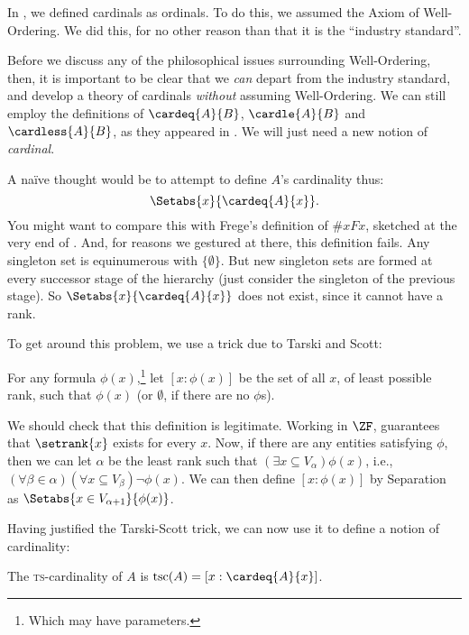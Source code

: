 \documentclass[../../../include/open-logic-section]{subfiles}
\begin{document}

In , we
defined cardinals as ordinals. To do this, we assumed the Axiom of
Well-Ordering. We did this, for no other reason than that it is the
``industry standard''.

Before we discuss any of the philosophical issues surrounding
Well-Ordering, then, it is important to be clear that we \emph{can}
depart from the industry standard, and develop a theory of cardinals
\emph{without} assuming Well-Ordering. We can still employ the
definitions of $\cardeq{A}{B}$, $\cardle{A}{B}$ and $\cardless{A}{B}$,
as they appeared in . We will just need a new
notion of \emph{cardinal}.

A na\"ive thought would be to attempt to define $A$'s cardinality thus:
\[
	\Setabs{x}{\cardeq{A}{x}}.
\]
You might want to compare this with Frege's definition of $\# x Fx$,
sketched at the very end of . And, for
reasons we gestured at there, this definition fails. Any singleton set
is equinumerous with $\{\emptyset\}$. But new singleton sets are
formed at every successor stage of the hierarchy (just consider the
singleton of the previous stage). So $\Setabs{x}{\cardeq{A}{x}}$ does
not exist, since it cannot have a rank.

To get around this problem, we use a trick due to Tarski and Scott:

\begin{defn}
For any formula $\phi(x)$,\footnote{Which may have parameters.} let
$[ x : \phi(x)] $ be the set of all $x$, of least possible rank, such
that $\phi(x)$ (or $\emptyset$, if there are no $\phi$s).
\end{defn}

We should check that this definition is legitimate. Working in $\ZF$,
 guarantees that
$\setrank{x}$ exists for every $x$. Now, if there are any entities
satisfying $\phi$, then we can let $\alpha$ be the least rank such
that  $(\exists x\subseteq V_\alpha)\phi(x)$, i.e., $(\forall \beta
\in \alpha)(\forall x \subseteq V_\beta)\lnot \phi(x)$. We can then
define $[x : \phi(x)]$ by Separation as $\Setabs{x \in
V_{\alpha+1}}{\phi(x)}$. 

Having justified the Tarski-Scott trick, we can now use it to define
a notion of cardinality:

\begin{defn}
The \textsc{ts}-cardinality of $A$ is $\text{tsc}(A) = [x :
\cardeq{A}{x}]$.
\end{defn}
\end{document}
